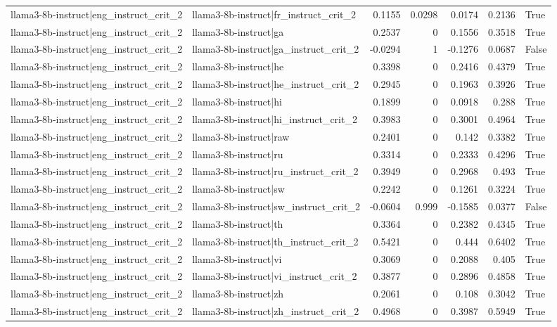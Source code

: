 \begin{table}
\begin{tabular}{l l r r r r l}
llama3-8b-instruct|eng_instruct_crit_2 & llama3-8b-instruct|fr_instruct_crit_2 & 0.1155 & 0.0298 & 0.0174 & 0.2136 & True \\
llama3-8b-instruct|eng_instruct_crit_2 & llama3-8b-instruct|ga & 0.2537 & 0 & 0.1556 & 0.3518 & True \\
llama3-8b-instruct|eng_instruct_crit_2 & llama3-8b-instruct|ga_instruct_crit_2 & -0.0294 & 1 & -0.1276 & 0.0687 & False \\
llama3-8b-instruct|eng_instruct_crit_2 & llama3-8b-instruct|he & 0.3398 & 0 & 0.2416 & 0.4379 & True \\
llama3-8b-instruct|eng_instruct_crit_2 & llama3-8b-instruct|he_instruct_crit_2 & 0.2945 & 0 & 0.1963 & 0.3926 & True \\
llama3-8b-instruct|eng_instruct_crit_2 & llama3-8b-instruct|hi & 0.1899 & 0 & 0.0918 & 0.288 & True \\
llama3-8b-instruct|eng_instruct_crit_2 & llama3-8b-instruct|hi_instruct_crit_2 & 0.3983 & 0 & 0.3001 & 0.4964 & True \\
llama3-8b-instruct|eng_instruct_crit_2 & llama3-8b-instruct|raw & 0.2401 & 0 & 0.142 & 0.3382 & True \\
llama3-8b-instruct|eng_instruct_crit_2 & llama3-8b-instruct|ru & 0.3314 & 0 & 0.2333 & 0.4296 & True \\
llama3-8b-instruct|eng_instruct_crit_2 & llama3-8b-instruct|ru_instruct_crit_2 & 0.3949 & 0 & 0.2968 & 0.493 & True \\
llama3-8b-instruct|eng_instruct_crit_2 & llama3-8b-instruct|sw & 0.2242 & 0 & 0.1261 & 0.3224 & True \\
llama3-8b-instruct|eng_instruct_crit_2 & llama3-8b-instruct|sw_instruct_crit_2 & -0.0604 & 0.999 & -0.1585 & 0.0377 & False \\
llama3-8b-instruct|eng_instruct_crit_2 & llama3-8b-instruct|th & 0.3364 & 0 & 0.2382 & 0.4345 & True \\
llama3-8b-instruct|eng_instruct_crit_2 & llama3-8b-instruct|th_instruct_crit_2 & 0.5421 & 0 & 0.444 & 0.6402 & True \\
llama3-8b-instruct|eng_instruct_crit_2 & llama3-8b-instruct|vi & 0.3069 & 0 & 0.2088 & 0.405 & True \\
llama3-8b-instruct|eng_instruct_crit_2 & llama3-8b-instruct|vi_instruct_crit_2 & 0.3877 & 0 & 0.2896 & 0.4858 & True \\
llama3-8b-instruct|eng_instruct_crit_2 & llama3-8b-instruct|zh & 0.2061 & 0 & 0.108 & 0.3042 & True \\
llama3-8b-instruct|eng_instruct_crit_2 & llama3-8b-instruct|zh_instruct_crit_2 & 0.4968 & 0 & 0.3987 & 0.5949 & True \\

\end{tabular}
\end{table}
